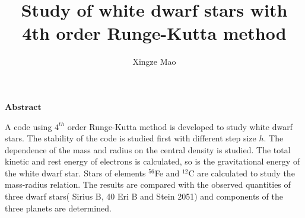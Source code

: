 \documentclass{article}
\begin{document}
\title{Study of white dwarf stars with 4th order Runge-Kutta method}
\author{Xingze Mao}
\maketitle


\begin{center}
$\mathbf{Abstract}$
\end{center}
A code using $4^{th}$ order Runge-Kutta method is developed to study white dwarf stars. The stability of the code is studied first with different step size $h$. The dependence of the mass and radius on the central density is studied. The total kinetic and rest energy of electrons is calculated, so is the gravitational energy of the white dwarf star. Stars of elements $^{56}$Fe and $^{12}$C are calculated to study the mass-radius relation. The results are compared with the observed quantities of three dwarf stars( Sirius B, 40 Eri B and Stein 2051) and components of the three planets are determined.
\end{document}
